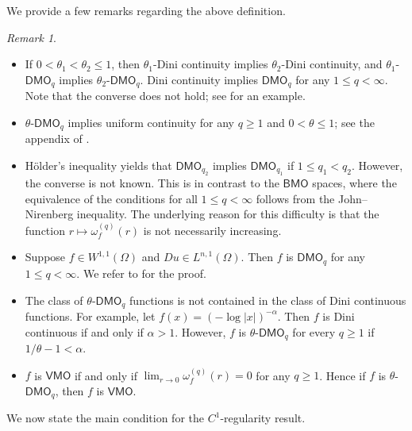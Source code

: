 \documentclass[reqno]{amsart}
\numberwithin{equation}{section}
\theoremstyle{plain}
\theoremstyle{definition}
\theoremstyle{remark}
\newtheorem{remark}[theorem]{Remark}
\providecommand{\abs}[1]{\lvert#1\rvert}
\begin{document}
We provide a few remarks regarding the above definition.
\begin{remark} \label{rmk:Dini}
\begin{itemize}
\item[(i)] If $0<\theta_1< \theta_2\le 1$, then $\theta_1$-Dini continuity implies $\theta_2$-Dini continuity, and $\theta_1$-$\mathsf{DMO}_q$ implies $\theta_2$-$\mathsf{DMO}_q$. Dini continuity implies $\mathsf{DMO}_q$ for any $1\le q <\infty$. Note that the converse does not hold; see \cite{DK17} for an example.
\item[(ii)] $\theta$-$\mathsf{DMO}_{q}$ implies uniform continuity for any $q\geq 1 $ and $0<\theta\leq 1$; see the appendix of \cite{HK20}.
\item[(iii)] H\"older's inequality yields that $\mathsf{DMO}_{q_2}$ implies $\mathsf{DMO}_{q_1}$ if $1\le q_1 < q_2$. However, the converse is not known. This is in contrast to the $\mathsf{BMO}$ spaces, where the equivalence of the conditions for all $1 \le q < \infty$ follows from the John--Nirenberg inequality. The underlying reason for this difficulty is that the function $r \mapsto \omega_f^{(q)}(r)$ is not necessarily increasing.
\item[(iv)] Suppose $f\in W^{1,1}(\Omega)$ and $Du\in L^{n,1}(\Omega)$. Then $f$ is $\mathsf{DMO}_{q}$ for any $1\le q <\infty$. We refer to \cite{HLO25} for the proof.
\item[(v)] The class of $\theta$-$\mathsf{DMO}_{q}$ functions is not contained in the class of Dini continuous functions. For example, let $f(x)=(-\log \abs{x})^{-\alpha}$. Then $f$ is Dini continuous if and only if $\alpha>1$. However, $f$ is $\theta$-$\mathsf{DMO}_{q}$ for every $q\ge 1$ if $1/\theta-1<\alpha$. 
\item[(vi)] $f$ is $\mathsf{VMO}$ if and only if $\lim_{r\rightarrow 0} \omega_f^{(q)}(r)=0$ for any $q\geq 1$. Hence if $f$ is $\theta$-$\mathsf{DMO}_{q}$, then $f$ is $\mathsf{VMO}$.
\end{itemize}
\end{remark}

 
We now state the main condition for the $C^1$-regularity result.  
\end{document}
